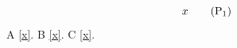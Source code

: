\documentclass{article}
\begin{document}
\begin{equation}x\tag{$\mathrm{P_1}$}\label{x}\end{equation}
A \ref{x}. B \eqref{x}. C \cref{x}.
\end{document}
